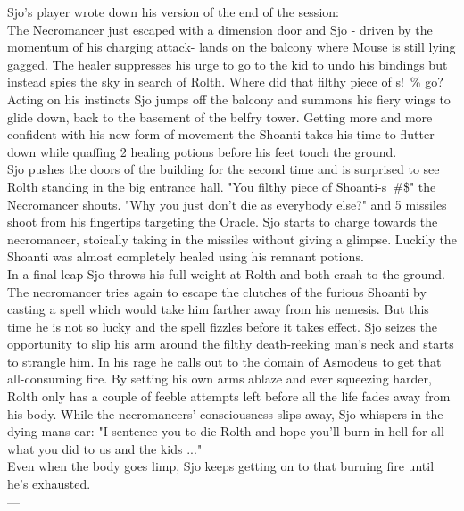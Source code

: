 Sjo's player wrote down his version of the end of the session:\\

The Necromancer just escaped with a dimension door and Sjo - driven by the momentum of his charging attack- lands on the balcony where Mouse is still lying gagged. The healer suppresses his urge to go to the kid to undo his bindings but instead spies the sky in search of Rolth. Where did that filthy piece of s!~\% go? Acting on his instincts Sjo jumps off the balcony and summons his fiery wings to glide down, back to the basement of the belfry tower. Getting more and more confident with his new form of movement the Shoanti takes his time to flutter down while quaffing 2 healing potions before his feet touch the ground.\\

Sjo pushes the doors of the building for the second time and is surprised to see Rolth standing in the big entrance hall. "You filthy piece of Shoanti-s~\#\$" the Necromancer shouts. "Why you just don't die as everybody else?" and 5 missiles shoot from his fingertips targeting the Oracle. Sjo starts to charge towards the necromancer, stoically taking in the missiles without giving a glimpse. Luckily the Shoanti was almost completely healed using his remnant potions.\\

In a final leap Sjo throws his full weight at Rolth and both crash to the ground. The necromancer tries again to escape the clutches of the furious Shoanti by casting a spell which would take him farther away from his nemesis. But this time he is not so lucky and the spell fizzles before it takes effect. Sjo seizes the opportunity to slip his arm around the filthy death-reeking man's neck and starts to strangle him. In his rage he calls out to the domain of Asmodeus to get that all-consuming fire. By setting his own arms ablaze and ever squeezing harder, Rolth only has a couple of feeble attempts left before all the life fades away from his body. While the necromancers' consciousness slips away, Sjo whispers in the dying mans ear: "I sentence you to die Rolth and hope you'll burn in hell for all what you did to us and the kids ..."\\

Even when the body goes limp, Sjo keeps getting on to that burning fire until he's exhausted.\\

---\\

